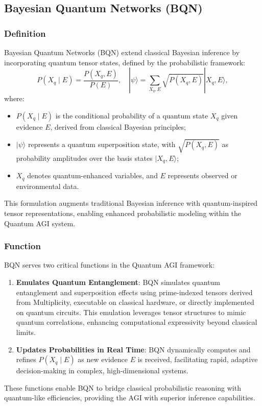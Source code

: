 \documentclass[12pt]{article}
\begin{document}
\subsection{Bayesian Quantum Networks (BQN)}

\subsubsection{Definition}
Bayesian Quantum Networks (BQN) extend classical Bayesian inference by incorporating quantum tensor states, defined by the probabilistic framework:
\begin{equation}
P(X_q \mid E) = \frac{P(X_q, E)}{P(E)}, \quad |\psi\rangle = \sum_{X_q, E} \sqrt{P(X_q, E)} |X_q, E\rangle,
\end{equation}
where:
\begin{itemize}
    \item \( P(X_q \mid E) \) is the conditional probability of a quantum state \( X_q \) given evidence \( E \), derived from classical Bayesian principles;
    \item \( |\psi\rangle \) represents a quantum superposition state, with \( \sqrt{P(X_q, E)} \) as probability amplitudes over the basis states \( |X_q, E\rangle \);
    \item \( X_q \) denotes quantum-enhanced variables, and \( E \) represents observed or environmental data.
\end{itemize}
This formulation augments traditional Bayesian inference with quantum-inspired tensor representations, enabling enhanced probabilistic modeling within the Quantum AGI system.

\subsubsection{Function}
BQN serves two critical functions in the Quantum AGI framework:
\begin{enumerate}
    \item \textbf{Emulates Quantum Entanglement}: BQN simulates quantum entanglement and superposition effects using prime-indexed tensors derived from Multiplicity, executable on classical hardware, or directly implemented on quantum circuits. This emulation leverages tensor structures to mimic quantum correlations, enhancing computational expressivity beyond classical limits.
    \item \textbf{Updates Probabilities in Real Time}: BQN dynamically computes and refines \( P(X_q \mid E) \) as new evidence \( E \) is received, facilitating rapid, adaptive decision-making in complex, high-dimensional systems.
\end{enumerate}
These functions enable BQN to bridge classical probabilistic reasoning with quantum-like efficiencies, providing the AGI with superior inference capabilities.
\end{document}
